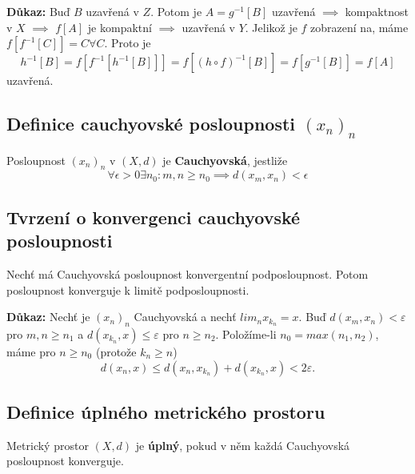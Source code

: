 \documentclass[10pt]{article}
\begin{document}
\vspace{5mm}
\noindent
\textbf{Důkaz:} Buď $B$ uzavřená v $Z$. Potom je $A = g^{-1}[B]$ uzavřená $\implies$ kompaktnost v $X$ $\implies$ $f[A]$ je kompaktní $\implies$ uzavřená v $Y$. Jelikož  je $f$ zobrazení na, máme $f[f^{-1}[C]] = C \forall C$. Proto je 
\[h^{-1}[B] = f[f^{-1}[h^{-1}[B]]] = f[(h \circ f)^{-1}[B]] = f[g^{-1}[B]] = f[A]\]
uzavřená.

\subsection{Definice cauchyovské posloupnosti $(x_n)_n$}
\hspace{1.2mm}
\noindent
Posloupnost $(x_n)_n$ v $(X,d)$ je \textbf{Cauchyovská}, jestliže
\[ \forall \epsilon > 0 \exists n_0: m,n \geq n_0 \implies d(x_m, x_n) < \epsilon \]

\subsection{Tvrzení o konvergenci cauchyovské posloupnosti}
\hspace{1.2mm}
\noindent
Nechť má Cauchyovská posloupnost konvergentní podposloupnost. Potom posloupnost konverguje k limitě
podposloupnosti.

\vspace{5mm}
\noindent
\textbf{Důkaz:} Nechť je $(x_n)_n$ Cauchyovská a nechť $lim_{n}x_{k_n} = x.$ Buď $d(x_m,x_n) < \varepsilon$ pro $m,n \geq n_1$ 
a $d(x_{k_n},x) \leq \varepsilon$ pro $n \geq n_2$. Položíme-li $n_0 = max(n_1,n_2)$, máme pro $n \geq n_0$ (protože $k_n \geq n$)
\[d(x_n,x) \leq d(x_n,x_{k_n}) + d(x_{k_n},x) < 2\varepsilon.\]

\subsection{Definice úplného metrického prostoru}
\hspace{1.2mm}
\noindent
Metrický prostor $(X,d)$ je \textbf{úplný}, pokud v něm každá Cauchyovská posloupnost konverguje.

\end{document}
